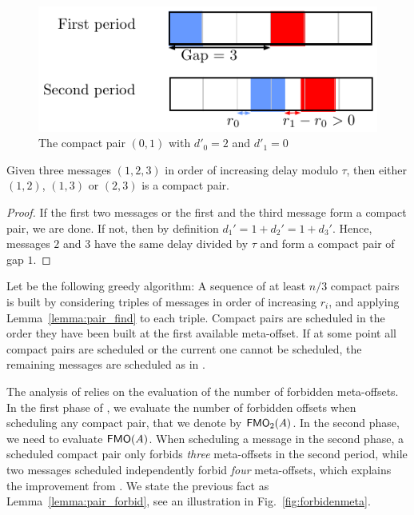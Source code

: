 \documentclass[pdflatex,sn-mathphys,iicol]{sn-jnl}%
\theoremstyle{thmstyleone}%
\theoremstyle{thmstyletwo}%
\theoremstyle{thmstylethree}%
\begin{document}
\begin{figure}[h]
\begin{center}

\includegraphics[scale=0.7]{compact_pair}
\end{center}
\caption{The compact pair $(0,1)$ with $d'_0 = 2$ and $d'_1 = 0$}
\label{fig:compactpair}
\end{figure}

\begin{lemma}\label{lemma:pair_find}
Given three messages $(1,2,3)$ in order of increasing delay modulo $\tau$, then either $(1,2)$, $(1,3)$ or $(2,3)$ is a compact pair. 
\end{lemma}
\begin{proof}
If the first two messages or the first and the third message form a compact pair, we are done. If not, then by definition $d_{1}' = 1 + d_{2}' = 1 + d_{3}'$. Hence, messages $2$ and $3$ have the same delay divided by $\tau$ and form a compact pair of gap $1$.
\end{proof}

Let \compactpair be the following greedy algorithm:  A sequence of at least $n/3$ compact pairs is built by considering triples of messages in order of increasing $r_i$, and applying Lemma~\ref{lemma:pair_find} to each triple. Compact pairs are scheduled in the order they have been built at the first available meta-offset. If at some point all compact pairs are scheduled or the current one cannot be scheduled, the remaining messages are scheduled as in \metaoffset. 

The analysis of \compactpair relies on the evaluation of the number of forbidden meta-offsets. In the first phase of \compactpair, we evaluate the number of forbidden offsets when scheduling any compact pair, that we denote by $\textsf{FMO}_2(A)$. In the second phase, we need to evaluate $\textsf{FMO}(A)$. When scheduling a message in the second phase, a scheduled compact pair only forbids \emph{three} meta-offsets in the second period, while two messages scheduled independently forbid \emph{four} meta-offsets, which explains the improvement from \compactpair. We state the previous fact as Lemma~\ref{lemma:pair_forbid}, see an illustration in Fig.~\ref{fig:forbidenmeta}. 
\end{document}
